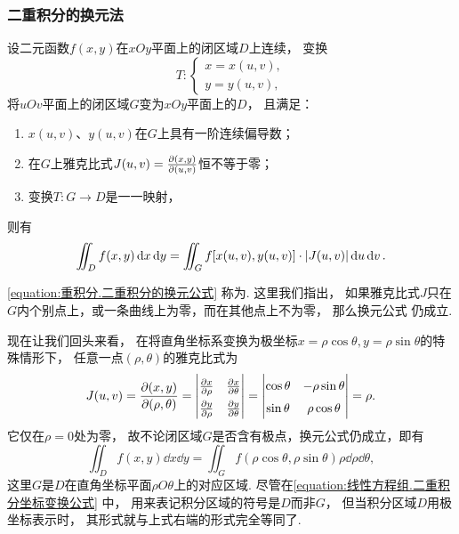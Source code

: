 \subsubsection{二重积分的换元法}
\begin{theorem}
设二元函数\(f(x,y)\)在\(xOy\)平面上的闭区域\(D\)上连续，
变换\[
	T\colon \left\{ \begin{array}{l}
		x = x(u,v), \\
		y = y(u,v),
	\end{array} \right.
\]将\(uOv\)平面上的闭区域\(G\)变为\(xOy\)平面上的\(D\)，
且满足：\begin{enumerate}
	\item \(x(u,v)\)、\(y(u,v)\)在\(G\)上具有一阶连续偏导数；
	\item 在\(G\)上雅克比式\(J(u,v) = \pdv{ (x,y) }{ (u,v) }\)恒不等于零；
	\item 变换\(T\colon G \to D\)是一一映射，
\end{enumerate}
则有\begin{equation}\label{equation:重积分.二重积分的换元公式}
	\iint_D f(x,y) \dd{x} \dd{y}
	= \iint_G f[x(u,v),y(u,v)] \cdot \abs{J(u,v)} \dd{u} \dd{v}.
\end{equation}
\end{theorem}
\cref{equation:重积分.二重积分的换元公式} 称为.
这里我们指出，
如果雅克比式\(J\)只在\(G\)内个别点上，或一条曲线上为零，而在其他点上不为零，
那么换元公式  仍成立.

现在让我们回头来看，
在将直角坐标系变换为极坐标\(x = \rho \cos\theta, y = \rho \sin\theta\)的特殊情形下，
任意一点\((\rho,\theta)\)的雅克比式为\[
	J(u,v)
	= \jacobi{x,y}{\rho,\theta}
	= {\def\arraystretch{1.5} \begin{vmatrix}
		\pdv{x}{\rho} & \pdv{x}{\theta} \\
		\pdv{y}{\rho} & \pdv{y}{\theta}
	\end{vmatrix}}
	= \begin{vmatrix}
		\cos\theta & -\rho \sin\theta \\
		\sin\theta & \rho \cos\theta
	\end{vmatrix}
	= \rho.
\]
它仅在\(\rho = 0\)处为零，
故不论闭区域\(G\)是否含有极点，换元公式仍成立，即有\[
	\iint_D f(x,y) \dd{x} \dd{y}
	= \iint_G f(\rho \cos\theta,\rho \sin\theta) \rho \dd{\rho} \dd{\theta},
\]
这里\(G\)是\(D\)在直角坐标平面\(\rho O \theta\)上的对应区域.
尽管在\cref{equation:线性方程组.二重积分坐标变换公式} 中，
用来表记积分区域的符号是\(D\)而非\(G\)，
但当积分区域\(D\)用极坐标表示时，
其形式就与上式右端的形式完全等同了.


